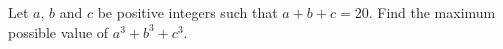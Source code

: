 Let $a$, $b$ and $c$ be positive integers such that $a+b+c=20$. Find the maximum possible value of $a^3+b^3+c^3$.
